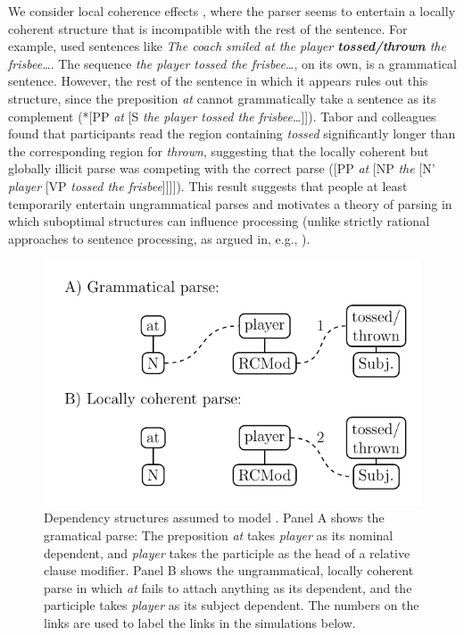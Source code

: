 \documentclass[10pt,letterpaper]{article}
\begin{document}
We consider local coherence effects \cite{tabor2004effects, konieczny2005psychological, paape2015local, bicknell2009correcting, levy2009eye}, where the parser seems to entertain a locally coherent structure that is incompatible with the rest of the sentence. For example,  used sentences like \emph{The coach smiled at the player \textbf{tossed/thrown} the frisbee\dots}. The sequence \emph{the player tossed the frisbee\dots}, on its own, is a grammatical sentence. However, the rest of the sentence in which it appears rules out this structure, since the preposition \emph{at} cannot grammatically take a sentence as its complement (*[PP \emph{at} [S \emph{the player tossed the frisbee\dots}]]). Tabor and colleagues found that participants read the region containing \emph{tossed} significantly longer than the corresponding region for \emph{thrown}, suggesting that the locally coherent but globally illicit parse was competing with the correct parse ([PP \emph{at} [NP \emph{the} [N' \emph{player} [VP \emph{tossed the frisbee}]]]]). This result suggests that people at least temporarily entertain ungrammatical parses and motivates a theory of parsing in which suboptimal structures can influence processing (unlike strictly rational approaches to sentence processing, as argued in, e.g., ).

\begin{figure}[h!]
\includegraphics[width=\linewidth]{../Figures/LocalCoherenceStructs.pdf}
\caption{Dependency structures assumed to model . Panel A shows the gramatical parse: The preposition \emph{at} takes \emph{player} as its nominal dependent, and \emph{player} takes the participle as the head of a relative clause modifier. Panel B shows the ungrammatical, locally coherent parse in which \emph{at} fails to attach anything as its dependent, and the participle takes \emph{player} as its subject dependent. The numbers on the links are used to label the links in the simulations below.}
\label{harmonylandscape}
\end{figure}
\end{document}
